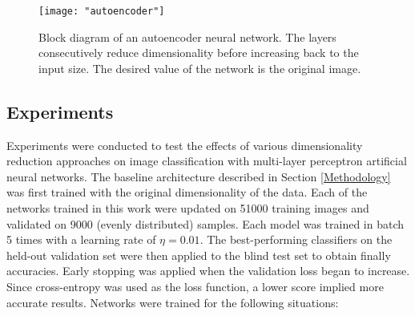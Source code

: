\documentclass[conference]{IEEEtran}
\begin{document}
\begin{center}
	\begin{figure}[t]
		\centering
		\texttt{[image: "autoencoder"]}
		\caption{Block diagram of an autoencoder neural network.  The layers consecutively reduce dimensionality before increasing back to the input size.  The desired value of the network is the original image.}
		\label{fig:autoencoder}
	\end{figure}
\end{center}


\subsection{Experiments} \label{Experiments}
Experiments were conducted to test the effects of various dimensionality reduction approaches on image classification with multi-layer perceptron artificial neural networks.  The baseline architecture described in Section \ref{Methodology} was first trained with the original dimensionality of the data.  Each of the networks trained in this work were updated on 51000 training images and validated on 9000 (evenly distributed) samples.  Each model was trained in batch 5 times with a learning rate of $\eta=0.01$. The best-performing classifiers on the held-out validation set were then applied to the blind test set to obtain finally accuracies.  Early stopping was applied when the validation loss began to increase.  Since cross-entropy was used as the loss function, a lower score implied more accurate results.  Networks were trained for the following situations:
\end{document}
